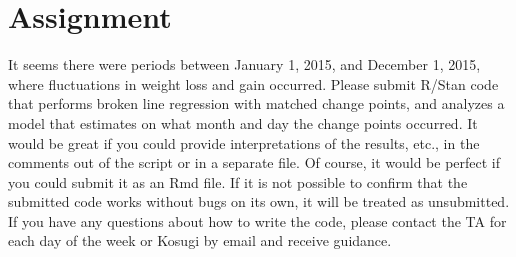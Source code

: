 \documentclass{ltjsbook}
\begin{document}
\section{Assignment}
It seems there were periods between January 1, 2015, and December 1, 2015, where fluctuations in weight loss and gain occurred.
Please submit R/Stan code that performs broken line regression with matched change points, and analyzes a model that estimates on what month and day the change points occurred. It would be great if you could provide interpretations of the results, etc., in the comments out of the script or in a separate file. Of course, it would be perfect if you could submit it as an Rmd file. If it is not possible to confirm that the submitted code works without bugs on its own, it will be treated as unsubmitted. If you have any questions about how to write the code, please contact the TA for each day of the week or Kosugi by email and receive guidance.
\end{document}
